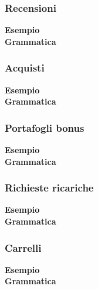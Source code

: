 \documentclass[a4paper, 14pt]{article}
\begin{document}
\begin{flushleft}
				\subsubsection{Recensioni}
					\textbf{Esempio}\\ 
					
					\bigskip \textbf{Grammatica}\\
					
				\subsubsection{Acquisti}
					\textbf{Esempio}\\ 
					
					\bigskip \textbf{Grammatica}\\
					
				\subsubsection{Portafogli bonus}
					\textbf{Esempio}\\ 
					
					\bigskip \textbf{Grammatica}\\
					
				\subsubsection{Richieste ricariche}
					\textbf{Esempio}\\ 
					
					\bigskip \textbf{Grammatica}\\
					
				\subsubsection{Carrelli}
				\textbf{Esempio}\\ 
				
				\bigskip \textbf{Grammatica}\\
				
		\bigskip
		

\end{flushleft}
\end{document}
